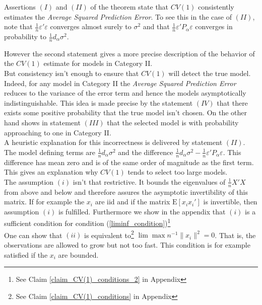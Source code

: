 \documentclass[Research_Module_ES.tex]{subfiles}
\begin{document}
Assertions $(I)$ and $(II)$ of the theorem state that $CV(1)$ consistently estimates the \textit{Average Squared Prediction Error}. To see this in the case of $(II)$, note that $\frac{1}{n}\varepsilon'\varepsilon$ converges almost surely to $\sigma^2$ and that 
$\frac{1}{n}\varepsilon'P_\alpha\varepsilon$ converges in probability to $\frac{1}{n}d_\alpha\sigma^2$.\

However the second statement gives a more precise description of the behavior of the $CV(1)$ estimate for models in Category II. \\

But consistency isn't enough to ensure that $CV(1)$ will detect the true model. 
Indeed, for any model in Category II the \textit{Average Squared Prediction Error} reduces to the variance of the error term and hence the models asymptotically indistinguishable. 
This idea is made precise by the statement $(IV)$ that there exists some positive probability that the true model isn't chosen. On the other hand \cite{shao} shows in statement $(III)$ that the selected model is with probability approaching to one in Category II.\\

A heuristic explanation for this incorrectness is delivered by statement $(II)$. The model defining terms are $\frac{1}{n}d_\alpha\sigma^2$ and the difference $\frac{1}{n}d_\alpha\sigma^2 - \frac{1}{n}\varepsilon'P_\alpha\varepsilon$. This difference has mean zero and is of the same order of magnitude as the first term. This gives an explanation why $CV(1)$ tends to select too large models.\\

The assumption $(i)$ isn't that restrictive. It bounds the eigenvalues of $\frac{1}{n}X'X$ from above and below and therefore assures the asymptotic invertibility of this matrix. If for example the $x_i$ are iid and if the matrix $\mathrm{E}[x_ix_i']$ is invertible, then assumption $(i)$ is fulfilled. Furthermore we show in the appendix that $(i)$ is a sufficient condition for condition (\ref{liminf_condition})\footnote{See Claim \ref{claim_CV(1)_conditions_2} in Appendix }\\

One can show that $(ii)$ is equivalent to\footnote{See Claim \ref{claim_CV(1)_conditions} in Appendix } 
$\lim \max n^{-1}\lVert x_i\rVert^2=0$. That is, the observations are allowed to grow but not too fast. This condition is for example satisfied if the $x_i$ are bounded.
\end{document}
